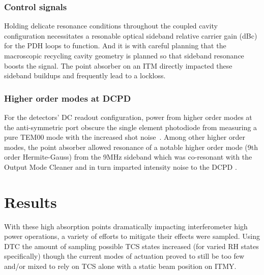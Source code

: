 \subsubsection{Control signals}
Holding delicate resonance conditions throughout the coupled cavity configuration necessitates a resonable optical sideband relative carrier gain (dBc) for the PDH loops to function. And it is with careful planning that the macroscopic recycling cavity geometry is planned so that sideband resonance boosts the signal. The point absorber on an ITM directly impacted these sideband buildups and frequently lead to a lockloss. 



\subsubsection{Higher order modes at DCPD}
For the detectors' DC readout configuration, power from higher order modes at the anti-symmetric port obscure the single element photodiode from measuring a pure TEM00 mode with the increased shot noise~\cite{fricke:2012}. Among other higher order modes, the point absorber allowed resonance of a notable higher order mode (9th order Hermite-Gauss) from the 9MHz sideband which was co-resonant with the Output Mode Cleaner and in turn imparted intensity noise to the DCPD \cite{elog:2019_03_03:brown}.


\section{Results}
With these high absorption points dramatically impacting interferometer high power operations, a variety of efforts to mitigate their effects were sampled. Using DTC the amount of sampling possible TCS states increased (for varied RH states specifically) though the current modes of actuation proved to still be too few and/or mixed to rely on TCS alone with a static beam position on ITMY.    

